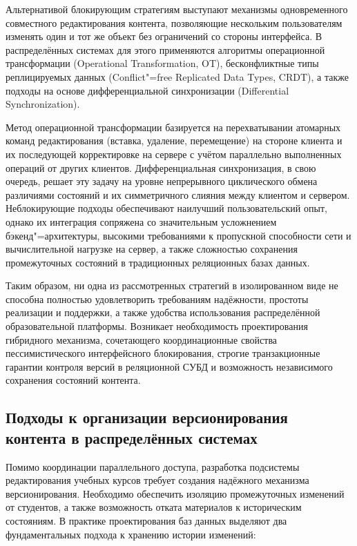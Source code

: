 \documentclass[coursework]{SCWorks}
\begin{document}
Альтернативой блокирующим стратегиям выступают механизмы одновременного совместного редактирования контента, позволяющие нескольким пользователям изменять один и тот же объект без ограничений со стороны интерфейса. В распределённых системах для этого применяются алгоритмы операционной трансформации (Operational Transformation, OT), бесконфликтные типы реплицируемых данных (Conflict"=free Replicated Data Types, CRDT), а также подходы на основе дифференциальной синхронизации (Differential Synchronization).

Метод операционной трансформации базируется на перехватывании атомарных команд редактирования (вставка, удаление, перемещение) на стороне клиента и их последующей корректировке на сервере с учётом параллельно выполненных операций от других клиентов. Дифференциальная синхронизация, в свою очередь, решает эту задачу на уровне непрерывного циклического обмена различиями состояний и их симметричного слияния между клиентом и сервером. Неблокирующие подходы обеспечивают наилучший пользовательский опыт, однако их интеграция сопряжена со значительным усложнением бэкенд"=архитектуры, высокими требованиями к пропускной способности сети и вычислительной нагрузке на сервер, а также сложностью сохранения промежуточных состояний в традиционных реляционных базах данных.

Таким образом, ни одна из рассмотренных стратегий в изолированном виде не способна полностью удовлетворить требованиям надёжности, простоты реализации и поддержки, а также удобства использования распределённой образовательной платформы. Возникает необходимость проектирования гибридного механизма, сочетающего координационные свойства пессимистического интерфейсного блокирования, строгие транзакционные гарантии контроля версий в реляционной СУБД и возможность независимого сохранения состояний контента.

\subsection{Подходы к организации версионирования контента в распределённых системах}

Помимо координации параллельного доступа, разработка подсистемы редактирования учебных курсов требует создания надёжного механизма версионирования. Необходимо обеспечить изоляцию промежуточных изменений от студентов, а также возможность отката материалов к историческим состояниям. В практике проектирования баз данных выделяют два фундаментальных подхода к хранению истории изменений:
\end{document}

